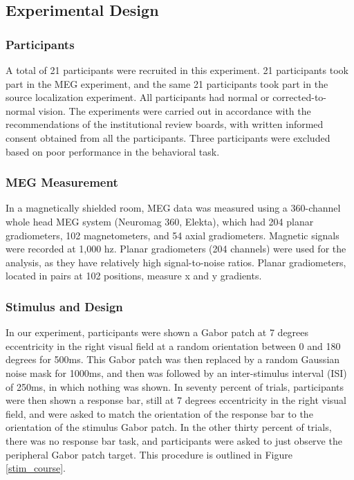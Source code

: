 \documentclass[../main.tex]{subfiles}
\begin{document}
\subsection*{Experimental Design}
\subsubsection*{Participants}
A total of 21 participants were recruited in this experiment. 21 participants took part in the MEG experiment, and the same 21 participants took part in the source localization experiment. All participants had normal or corrected-to-normal vision. The experiments were carried out in accordance with the recommendations of the institutional review boards, with written informed consent obtained from all the participants. Three participants were excluded based on poor performance in the behavioral task.

\subsubsection*{MEG Measurement}
In a magnetically shielded room, MEG data was measured using a 360-channel whole head MEG system (Neuromag 360, Elekta), which had 204 planar gradiometers, 102 magnetometers, and 54 axial gradiometers. Magnetic signals were recorded at 1,000 hz. Planar gradiometers (204 channels) were used for the analysis, as they have relatively high signal-to-noise ratios. Planar gradiometers, located in pairs at 102 positions, measure x and y gradients.

\subsubsection*{Stimulus and Design}
In our experiment, participants were shown a Gabor patch at 7 degrees eccentricity in the right visual field at a random orientation between 0 and 180 degrees for 500ms. This Gabor patch was then replaced by a random Gaussian noise mask for 1000ms, and then was followed by an inter-stimulus interval (ISI) of 250ms, in which nothing was shown. In seventy percent of trials, participants were then shown a response bar, still at 7 degrees eccentricity in the right visual field, and were asked to match the orientation of the response bar to the orientation of the stimulus Gabor patch. In the other thirty percent of trials, there was no response bar task, and participants were asked to just observe the peripheral Gabor patch target. This procedure is outlined in Figure \ref{stim_course}.
\end{document}

